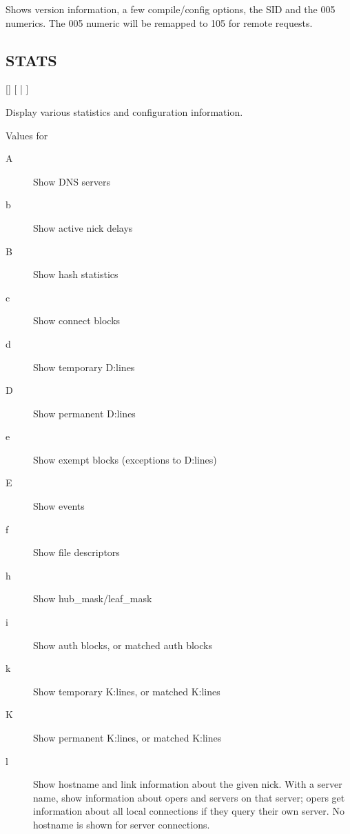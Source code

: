 	Shows version information, a few compile/config options,
	the SID and the 005 numerics.
	The 005 numeric will be remapped to 105 for remote requests.


\subsection{STATS}

    [] [ | ]

	Display various statistics and configuration information.


{\sc Values for }
\nopagebreak

\noindent
\begin{description}
\item[{A}]
	Show DNS servers

\item[{b}]
	Show active nick delays

\item[{B}]
	Show hash statistics

\item[{c}]
	Show connect blocks

\item[{d}]
	Show temporary D:lines

\item[{D}]
	Show permanent D:lines

\item[{e}]
	Show exempt blocks (exceptions to D:lines)

\item[{E}]
	Show events

\item[{f}]
	Show file descriptors

\item[{h}]
	Show hub\_mask/leaf\_mask

\item[{i}]
	Show auth blocks, or matched auth blocks

\item[{k}]
	Show temporary K:lines, or matched K:lines

\item[{K}]
	Show permanent K:lines, or matched K:lines

\item[{l}]
	Show hostname and link information about the given nick. With a server
	name, show information about opers and servers on that server; opers
	get information about all local connections if they query their own
	server. No hostname is shown for server connections.


\end{description}
